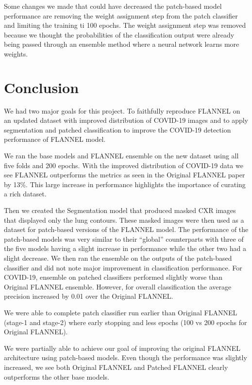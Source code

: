 \documentclass{sigkddExp}
\begin{document}
Some changes we made that could have decreased the patch-based model performance
are removing the weight assignment step from the patch classifier and limiting
the training ti 100 epochs. The weight assignment step was removed because we
thought the probabilities of the classification output were already being passed
through an ensemble method where a neural network learns more weights.



\section{Conclusion}
We had two major goals for this project. To faithfully reproduce FLANNEL on an
updated dataset with improved distribution of COVID-19 images and to apply
segmentation and patched classification to improve the COVID-19 detection
performance of FLANNEL model.

We ran the base models and FLANNEL ensemble on the new dataset using all five
folds and 200 epochs. With the improved distribution of COVID-19 data we see
FLANNEL outperforms the metrics as seen in the Original FLANNEL paper by 13\%.
This large increase in performance highlights the importance of curating a rich
dataset.

Then we created the Segmentation model that produced masked CXR images that
displayed only the lung contours. These masked images were then used as a
dataset for patch-based versions of the FLANNEL model. The performance of the
patch-based models was very similar to their “global” counterparts with three of
the five models having a slight increase in performance while the other two had
a slight decrease. We then ran the ensemble on the outputs of the patch-based
classifier and did not note major improvement in classification performance. For
COVID-19, ensemble on patched classifiers performed slightly worse than Original
FLANNEL ensemble. However, for overall classification the average precision
increased by 0.01 over the Original FLANNEL.

We were able to complete patch classifier run earlier than Original FLANNEL
(stage-1 and stage-2) where early stopping and less epochs (100 vs 200 epochs
for Original FLANNEL).

We were partially able to achieve our goal of improving the original FLANNEL
architecture using patch-based models. Even though the performance was slightly
increased, we see both Original FLANNEL and Patched FLANNEL clearly outperforms
the other base models.
\end{document}

